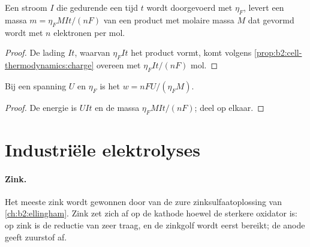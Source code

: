 \begin{proposition}\label{prop:b2:batteries-electrolysis:faraday-mass}
Een stroom $I$ die gedurende een tijd $t$ wordt doorgevoerd met  $\eta_F$, levert een
massa $m = \eta_F MIt/(nF)$ van een product met molaire massa $M$ dat gevormd wordt met $n$
elektronen per mol.
\end{proposition}

\begin{proof}
De lading $It$, waarvan $\eta_F It$ het product vormt, komt volgens
\cref{prop:b2:cell-thermodynamics:charge} overeen met $\eta_F It/(nF)$ mol.
\end{proof}

\begin{proposition}\label{prop:b2:batteries-electrolysis:energy}
Bij een spanning $U$ en  $\eta_F$ is het  $w = nFU/(\eta_F M)$.
\end{proposition}

\begin{proof}
De energie is $UIt$ en de massa $\eta_F MIt/(nF)$; deel op elkaar.
\end{proof}

\section{Industriële elektrolyses}

\paragraph{Zink.} Het meeste zink wordt gewonnen door  van de zure
zinksulfaatoplossing van \cref{ch:b2:ellingham}. Zink zet zich af op de kathode hoewel
 de sterkere oxidator is: op zink is de reductie van  zeer traag,
en de zinkgolf wordt eerst bereikt; de anode geeft zuurstof af.

